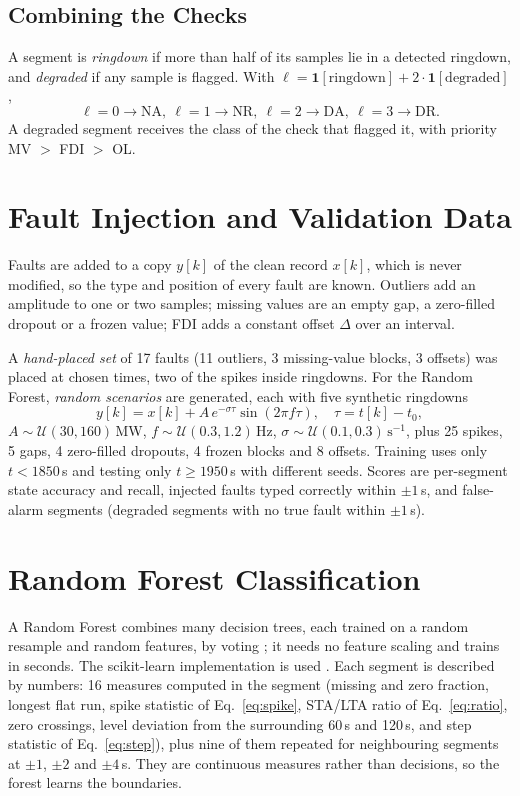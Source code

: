 \documentclass[12pt,letterpaper]{article}
\begin{document}
\subsection{Combining the Checks}
A segment is \emph{ringdown} if more than half of its samples lie in a detected ringdown, and \emph{degraded} if any sample is flagged. With $\ell=\mathbf{1}[\text{ringdown}]+2\cdot\mathbf{1}[\text{degraded}]$,
\begin{equation}
\ell=0\to\text{NA},\ \ell=1\to\text{NR},\ \ell=2\to\text{DA},\ \ell=3\to\text{DR}.\label{eq:label}
\end{equation}
A degraded segment receives the class of the check that flagged it, with priority MV $>$ FDI $>$ OL.

\section{Fault Injection and Validation Data}\label{sec:inject}
Faults are added to a copy $y[k]$ of the clean record $x[k]$, which is never modified, so the type and position of every fault are known. Outliers add an amplitude to one or two samples; missing values are an empty gap, a zero-filled dropout or a frozen value; FDI adds a constant offset $\Delta$ over an interval.

A \emph{hand-placed set} of 17 faults (11 outliers, 3 missing-value blocks, 3 offsets) was placed at chosen times, two of the spikes inside ringdowns. For the Random Forest, \emph{random scenarios} are generated, each with five synthetic ringdowns
\begin{equation}
y[k]=x[k]+A\,e^{-\sigma\tau}\sin(2\pi f\tau),\quad \tau=t[k]-t_0,\label{eq:ringdown}
\end{equation}
$A\sim\mathcal{U}(30,160)$\,MW, $f\sim\mathcal{U}(0.3,1.2)$\,Hz, $\sigma\sim\mathcal{U}(0.1,0.3)\,\mathrm{s}^{-1}$, plus 25 spikes, 5 gaps, 4 zero-filled dropouts, 4 frozen blocks and 8 offsets. Training uses only $t<1850$\,s and testing only $t\ge1950$\,s with different seeds. Scores are per-segment state accuracy and recall, injected faults typed correctly within $\pm1$\,s, and false-alarm segments (degraded segments with no true fault within $\pm1$\,s).

\section{Random Forest Classification}\label{sec:rf}
A Random Forest combines many decision trees, each trained on a random resample and random features, by voting \cite{breiman2001}; it needs no feature scaling and trains in seconds. The scikit-learn implementation is used \cite{pedregosa2011}. Each segment is described by \nFeat{} numbers: 16 measures computed in the segment (missing and zero fraction, longest flat run, spike statistic of Eq.~\eqref{eq:spike}, STA/LTA ratio of Eq.~\eqref{eq:ratio}, zero crossings, level deviation from the surrounding 60\,s and 120\,s, and step statistic of Eq.~\eqref{eq:step}), plus nine of them repeated for neighbouring segments at $\pm1$, $\pm2$ and $\pm4$\,s. They are continuous measures rather than decisions, so the forest learns the boundaries.
\end{document}
